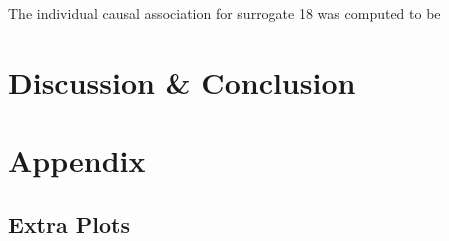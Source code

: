 \documentclass[a4paper,12pt]{article}
\begin{document}
	The individual causal association for surrogate 18 was computed to be 
	
	
	
	
	
	\section{Discussion \& Conclusion}
	
	
	
	
	
	\section*{Appendix}
	\subsection*{Extra Plots}
\end{document}

